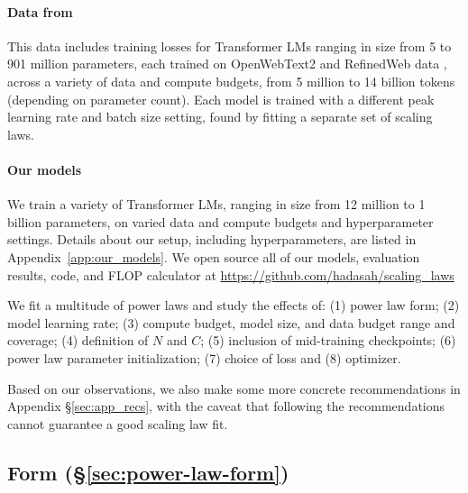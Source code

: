 \paragraph{Data from \citet{porian2024resolving}} This data includes training losses for Transformer LMs ranging in size from 5 to 901 million parameters, each trained on 
OpenWebText2 \citep{gao2020pile800gbdatasetdiverse} and RefinedWeb data \citep{penedo2023refinedwebdatasetfalconllm}, across a variety of data and compute budgets, from 5 million to 14 billion tokens (depending on parameter count). Each model is trained with a different peak learning rate and batch size setting, found by fitting a separate set of scaling laws.


\paragraph{Our models} We train a variety of Transformer LMs, ranging in size from 12 million to 1 billion parameters, on varied data and compute budgets and hyperparameter settings. Details about our setup, including hyperparameters, are listed in Appendix~\ref{app:our_models}. We open source all of our models, evaluation results, code, and FLOP calculator at \url{https://github.com/hadasah/scaling_laws}

We fit a multitude of power laws and study the effects of: (1) power law form; 
(2) model learning rate; 
(3) compute budget, model size, and data budget range and coverage; 
(4) definition of $N$ and $C$;
(5) inclusion of mid-training checkpoints;
(6) power law parameter initialization; 
(7) choice of loss and (8) optimizer.

Based on our observations, we also make some more concrete recommendations in Appendix \S\ref{sec:app_recs}, with the caveat that following the recommendations cannot guarantee a good scaling law fit. 




\subsection{Form (\S\ref{sec:power-law-form})} \label{sec:repl-power-law-form}

